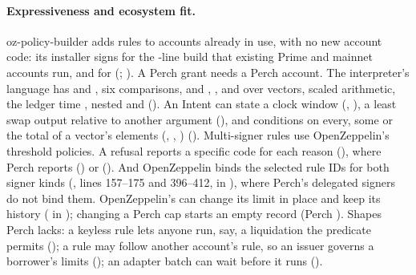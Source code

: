 \paragraph{Expressiveness and ecosystem fit.} oz-policy-builder adds rules to
accounts already in use, with no new account code: its installer signs for the
-line build that existing Prime and mainnet accounts run, and for
 (;
). A Perch grant needs a Perch account.
The interpreter's language has
 and , six comparisons,  and , ,
 and  over vectors, scaled arithmetic, the ledger time
, nested  and 
(). An Intent can state a clock window
(, ), a least swap output relative to another argument
(), and conditions on every, some or the total of a vector's elements
(, , ) (). Multi-signer
rules use OpenZeppelin's threshold policies. A refusal reports a specific code
for each reason (), where Perch
reports  () or
 (). And OpenZeppelin
 binds the selected rule IDs for both signer kinds
(, lines 157--175 and 396--412, in ), where Perch's
delegated signers do not bind them. OpenZeppelin's  can change
its limit in place and keep its history (
in ); changing a Perch cap starts an empty record (Perch
). Shapes Perch lacks: a keyless
rule lets anyone run, say, a liquidation the predicate permits
(); a rule may follow another account's rule, so
an issuer governs a borrower's limits ();
an adapter batch can wait before it runs ().
